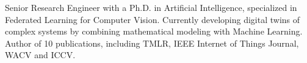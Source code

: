 \par{
Senior Research Engineer with a Ph.D. in Artificial Intelligence, specialized in Federated Learning for Computer Vision. Currently developing digital twins of complex systems by combining mathematical modeling with Machine Learning. Author of 10 publications, including TMLR, IEEE Internet of Things Journal, WACV and ICCV.}\vspace{0.5em}
